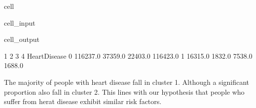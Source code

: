 \documentclass[letterpaper,10pt,english]{jupyterBook}
\begin{document}
\begin{sphinxuseclass}{cell}
\begin{sphinxVerbatimInput}
\begin{sphinxuseclass}{cell_input}
\end{sphinxuseclass}\end{sphinxVerbatimInput}
\begin{sphinxVerbatimOutput}

\begin{sphinxuseclass}{cell_output}
\begin{sphinxVerbatim}[commandchars=\\\{\}]
                     1        2        3         4
HeartDisease                                      
0             116237.0  37359.0  22403.0  116423.0
1              16315.0   1832.0   7538.0    1688.0
\end{sphinxVerbatim}

\noindent{}

\end{sphinxuseclass}\end{sphinxVerbatimOutput}

\end{sphinxuseclass}
\sphinxAtStartPar
The majority of people with heart disease fall in cluster 1. Although a significant proportion also fall in cluster 2. This lines with our hypothesis that people who suffer from herat disease exhibit similar risk factors.
\end{document}
